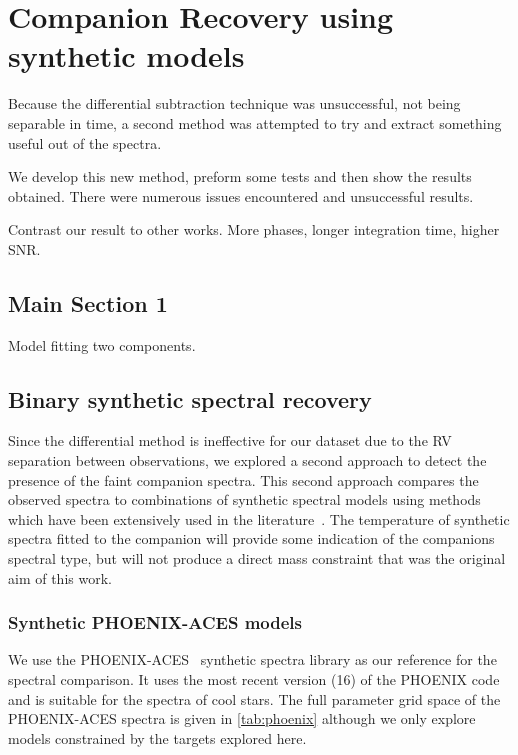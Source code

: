
\chapter{Companion Recovery using synthetic models}  %
\label{cha:model_comparison}

Because the differential subtraction technique was unsuccessful, not being separable in time, a second method was attempted to try and extract something useful out of the spectra.

We develop this new method, preform some tests and then show the results obtained.
There were numerous issues encountered and unsuccessful results.

Contrast our result to other works.  More phases, longer integration time, higher {SNR}.




\section{Main Section 1}
Model fitting two components.




\section{Binary synthetic spectral recovery}
\label{subsec:companion_recovery}
Since the differential method is ineffective for our dataset due to the {RV} separation between observations, we explored a second approach to detect the presence of the faint companion spectra.
This second approach compares the observed spectra to combinations of synthetic spectral models using \textchisquared{} methods which have been extensively used in the literature~\citep[e.g.][]{astudillo-defru_harps_2015, passegger_fundamental_2016, zechmeister_spectrum_2018, nemravova_xtauri_2016}. {\red{} The temperature of synthetic spectra fitted to  the companion will provide some indication of the companions spectral type, but will not produce a direct mass constraint that was the original aim of this work.}

\subsection{Synthetic {PHOENIX-ACES} models}
\label{subsec:spec_models}
We use the {PHOENIX-ACES}~\citep{husser_new_2013} synthetic spectra library as our reference for the spectral comparison.
It uses the most recent version (16) of the {PHOENIX} code and is suitable for the spectra of cool stars.
The full parameter grid space of the {PHOENIX-ACES} spectra is given in \cref{tab:phoenix} although we only explore models constrained by the targets explored here.

